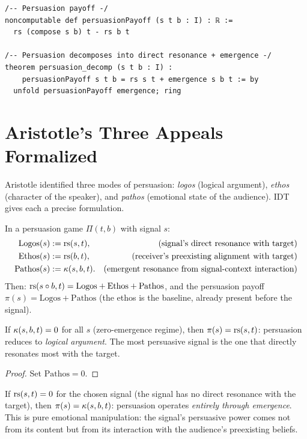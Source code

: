 \begin{lstlisting}[caption={Lean 4: Persuasion decomposition}]
/-- Persuasion payoff -/
noncomputable def persuasionPayoff (s t b : I) : ℝ :=
  rs (compose s b) t - rs b t

/-- Persuasion decomposes into direct resonance + emergence -/
theorem persuasion_decomp (s t b : I) :
    persuasionPayoff s t b = rs s t + emergence s b t := by
  unfold persuasionPayoff emergence; ring
\end{lstlisting}


\section{Aristotle's Three Appeals Formalized}

Aristotle identified three modes of persuasion: \emph{logos} (logical
argument), \emph{ethos} (character of the speaker), and \emph{pathos}
(emotional state of the audience). IDT gives each a precise formulation.

\begin{definition}
\label{def:rhetorical-decomp}
In a persuasion game $\Pi(t, b)$ with signal $s$:
\begin{align*}
\text{Logos}(s) &:= \mathrm{rs}(s, t), &
\text{(signal's direct resonance with target)} \\
\text{Ethos}(s) &:= \mathrm{rs}(b, t), &
\text{(receiver's preexisting alignment with target)} \\
\text{Pathos}(s) &:= \kappa(s, b, t). &
\text{(emergent resonance from signal-context interaction)}
\end{align*}
Then: $\mathrm{rs}(s \circ b, t) = \text{Logos} + \text{Ethos} + \text{Pathos}$,
and the persuasion payoff $\pi(s) = \text{Logos} + \text{Pathos}$ (the
ethos is the baseline, already present before the signal).
\end{definition}

\begin{theorem}
\label{thm:logos-only}
If $\kappa(s, b, t) = 0$ for all $s$ (zero-emergence regime), then
$\pi(s) = \mathrm{rs}(s, t)$: persuasion reduces to \emph{logical argument}.
The most persuasive signal is the one that directly resonates most with the
target.
\end{theorem}

\begin{proof}
Set $\text{Pathos} = 0$.
\end{proof}

\begin{theorem}
\label{thm:pathos-dominant}
If $\mathrm{rs}(s, t) = 0$ for the chosen signal (the signal has no direct resonance
with the target), then $\pi(s) = \kappa(s, b, t)$: persuasion operates
\emph{entirely through emergence}. This is pure emotional manipulation: the
signal's persuasive power comes not from its content but from its interaction
with the audience's preexisting beliefs.
\end{theorem}

